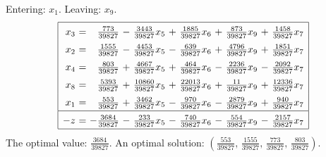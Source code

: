 \documentclass[11pt]{article}
\begin{document}
Entering: $x_{1}$. Leaving: $x_{9}$. 
\begin{equation*}
\renewcommand{\arraystretch}{1.5} %
\begin{array}{|rcrcrcrcrcr|}
\hline
x_{3} \mspace{-6mu}&\mspace{-6mu} = \mspace{-6mu}&\mspace{-6mu} \frac{773}{39827} \mspace{-6mu}&\mspace{-6mu} - \mspace{-6mu}&\mspace{-6mu} \frac{3443}{39827} x_{5} \mspace{-6mu}&\mspace{-6mu} + \mspace{-6mu}&\mspace{-6mu} \frac{1885}{39827} x_{6} \mspace{-6mu}&\mspace{-6mu} + \mspace{-6mu}&\mspace{-6mu} \frac{873}{39827} x_{9} \mspace{-6mu}&\mspace{-6mu} + \mspace{-6mu}&\mspace{-6mu} \frac{1458}{39827} x_{7}\\
x_{2} \mspace{-6mu}&\mspace{-6mu} = \mspace{-6mu}&\mspace{-6mu} \frac{1555}{39827} \mspace{-6mu}&\mspace{-6mu} - \mspace{-6mu}&\mspace{-6mu} \frac{4453}{39827} x_{5} \mspace{-6mu}&\mspace{-6mu} - \mspace{-6mu}&\mspace{-6mu} \frac{639}{39827} x_{6} \mspace{-6mu}&\mspace{-6mu} + \mspace{-6mu}&\mspace{-6mu} \frac{4796}{39827} x_{9} \mspace{-6mu}&\mspace{-6mu} + \mspace{-6mu}&\mspace{-6mu} \frac{1851}{39827} x_{7}\\
x_{4} \mspace{-6mu}&\mspace{-6mu} = \mspace{-6mu}&\mspace{-6mu} \frac{803}{39827} \mspace{-6mu}&\mspace{-6mu} + \mspace{-6mu}&\mspace{-6mu} \frac{4667}{39827} x_{5} \mspace{-6mu}&\mspace{-6mu} + \mspace{-6mu}&\mspace{-6mu} \frac{464}{39827} x_{6} \mspace{-6mu}&\mspace{-6mu} - \mspace{-6mu}&\mspace{-6mu} \frac{2236}{39827} x_{9} \mspace{-6mu}&\mspace{-6mu} - \mspace{-6mu}&\mspace{-6mu} \frac{2092}{39827} x_{7}\\
x_{8} \mspace{-6mu}&\mspace{-6mu} = \mspace{-6mu}&\mspace{-6mu} \frac{5393}{39827} \mspace{-6mu}&\mspace{-6mu} + \mspace{-6mu}&\mspace{-6mu} \frac{10860}{39827} x_{5} \mspace{-6mu}&\mspace{-6mu} + \mspace{-6mu}&\mspace{-6mu} \frac{22013}{39827} x_{6} \mspace{-6mu}&\mspace{-6mu} + \mspace{-6mu}&\mspace{-6mu} \frac{11}{39827} x_{9} \mspace{-6mu}&\mspace{-6mu} + \mspace{-6mu}&\mspace{-6mu} \frac{12336}{39827} x_{7}\\
x_{1} \mspace{-6mu}&\mspace{-6mu} = \mspace{-6mu}&\mspace{-6mu} \frac{553}{39827} \mspace{-6mu}&\mspace{-6mu} + \mspace{-6mu}&\mspace{-6mu} \frac{3462}{39827} x_{5} \mspace{-6mu}&\mspace{-6mu} - \mspace{-6mu}&\mspace{-6mu} \frac{970}{39827} x_{6} \mspace{-6mu}&\mspace{-6mu} - \mspace{-6mu}&\mspace{-6mu} \frac{2879}{39827} x_{9} \mspace{-6mu}&\mspace{-6mu} + \mspace{-6mu}&\mspace{-6mu} \frac{940}{39827} x_{7}\\
\hline
-z \mspace{-6mu}&\mspace{-6mu} = \mspace{-6mu}&\mspace{-6mu} -\frac{3684}{39827} \mspace{-6mu}&\mspace{-6mu} - \mspace{-6mu}&\mspace{-6mu} \frac{233}{39827} x_{5} \mspace{-6mu}&\mspace{-6mu} - \mspace{-6mu}&\mspace{-6mu} \frac{740}{39827} x_{6} \mspace{-6mu}&\mspace{-6mu} - \mspace{-6mu}&\mspace{-6mu} \frac{554}{39827} x_{9} \mspace{-6mu}&\mspace{-6mu} - \mspace{-6mu}&\mspace{-6mu} \frac{2157}{39827} x_{7}\\
\hline
\end{array}
\end{equation*}
The optimal value: $\frac{3684}{39827}$. An optimal solution: $\left(\frac{553}{39827},\,\frac{1555}{39827},\,\frac{773}{39827},\,\frac{803}{39827}\right)$.
\end{document}
